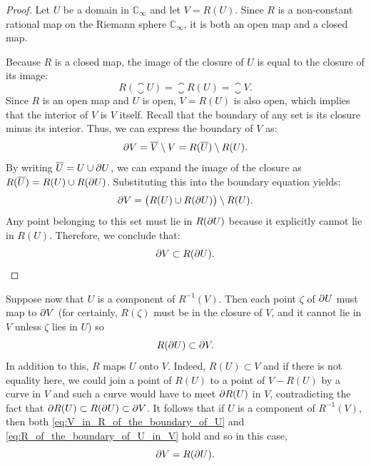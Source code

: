 \begin{proof}
    Let $U$ be a domain in $\mathbb{C}_\infty$ and let $V = R(U)$. Since $R$ is
    a non-constant rational map on the Riemann sphere $\mathbb{C}_\infty$, it is
    both an open map and a closed map. 
    
    Because $R$ is a closed map, the image of the closure of $U$ is equal to the
    closure of its image:
    \begin{equation*}
        R(\closure{U}) = \closure{R(U)} = \closure{V}.
    \end{equation*}
    Since $R$ is an open map and $U$ is open, $V = R(U)$ is also open, which
    implies that the interior of $V$ is $V$ itself. Recall that the boundary of
    any set is its closure minus its interior. Thus, we can express the boundary
    of $V$ as:
    \begin{equation*}
        \partial {V} = \overline{V} \setminus V = R(\overline{U}) \setminus R(U).
    \end{equation*}
    By writing $\overline{U} = U \cup \partial {U}$, we can expand the image of
    the closure as $R(\overline{U}) = R(U) \cup R(\partial {U})$. Substituting
    this into the boundary equation yields:
    \begin{equation*}
        \partial {V} = \big( R(U) \cup R(\partial {U}) \big) \setminus R(U).
    \end{equation*}
    Any point belonging to this set must lie in $R(\partial {U})$ because it
    explicitly cannot lie in $R(U)$. Therefore, we conclude that:
    \begin{equation*}
        \partial {V} \subset R(\partial {U}).
    \end{equation*}
\end{proof}

\begin{remark}[For $U$ a component of $R^{-1}(V)$: $R(U) = V$ and $R(\boundary{U}) = \boundary{V}$]
    Suppose now that $U$ is a component of $R^{-1}(V)$. Then each point $\zeta$
    of $\partial {U}$ must map to $\partial {V}$ (for certainly, $R(\zeta)$ must
    be in the closure of $V$, and it cannot lie in $V$ unless $\zeta$ lies in
    $U$) so
    \begin{equation}
        \label{eq:R_of_the_boundary_of_U_in_V}
        R(\partial {U}) \subset \partial {V}.
    \end{equation}
    In addition to this, $R$ maps $U$ onto $V$. Indeed, $R(U) \subset V$ and if
    there is not equality here, we could join a point of $R(U)$ to a point of $V
    - R(U)$ by a curve in $V$ and such a curve would have to meet
    $\partial {R(U)}$ in $V$, contradicting the fact that $\partial {R(U)}
    \subset R(\partial {U}) \subset \partial {V}$. It follows that if $U$ is a
    component of $R^{-1}(V)$, then both \eqref{eq:V_in_R_of_the_boundary_of_U}
    and \eqref{eq:R_of_the_boundary_of_U_in_V} hold and so in this case,
    \begin{equation*}
        \partial {V} = R(\partial {U}).
    \end{equation*}
\end{remark}

